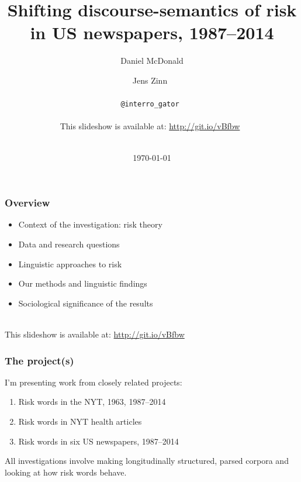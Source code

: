\documentclass{beamer}       %
\title[FEAST]{Shifting discourse-semantics of risk in US newspapers, 1987--2014}
\author[McDonald \& Zinn]{Daniel McDonald \and Jens Zinn~\\~\\\texttt{@interro\_gator}~\\~\\This slideshow is available at: \url{http://git.io/vBfbw}~\\~\\}
\date{\today}
\begin{document}

\frame{\titlepage}


\begin{frame}
    \frametitle{Overview}
    
    \begin{itemize}
    \item Context of the investigation: risk theory
    \item Data and research questions
    \item Linguistic approaches to risk
    \item Our methods and linguistic findings
    \item Sociological significance of the results
    \end{itemize}

    ~\\ This slideshow is available at: \url{http://git.io/vBfbw}

\end{frame}

\begin{frame}\frametitle{The project(s)}

I'm presenting work from closely related projects:

\begin{enumerate}
    \item Risk words in the NYT, 1963, 1987--2014
    \item Risk words in NYT health articles
    \item Risk words in six US newspapers, 1987--2014
\end{enumerate}

All investigations involve making longitudinally structured, parsed corpora and looking at how risk words behave.

\end{frame}
\end{document}
